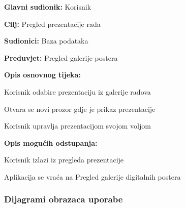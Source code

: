 					\noindent {}
					\begin{packed_item}
						
						\item \textbf{Glavni sudionik: }Korisnik
						\item  \textbf{Cilj:} Pregled prezentacije rada
						\item  \textbf{Sudionici:} Baza podataka
						\item  \textbf{Preduvjet:} Pregled galerije postera
						\item  \textbf{Opis osnovnog tijeka:}
						
						\item[] \begin{packed_enum}
							
							\item Korisnik odabire prezentaciju iz galerije radova
							\item Otvara se novi prozor gdje je prikaz prezentacije
							\item Korisnik upravlja prezentacijom svojom voljom

						\end{packed_enum}
						
						\item  \textbf{Opis mogućih odstupanja:}
						
						\item[] \begin{packed_item}
							
							\item[3.a] Korisnik izlazi iz pregleda prezentacije
							\item[] \begin{packed_enum}
								
								\item Aplikacija se vraća na Pregled galerije digitalnih postera
								
							\end{packed_enum}							
						\end{packed_item}
					\end{packed_item}											
					
				\subsubsection{Dijagrami obrazaca uporabe}
					
